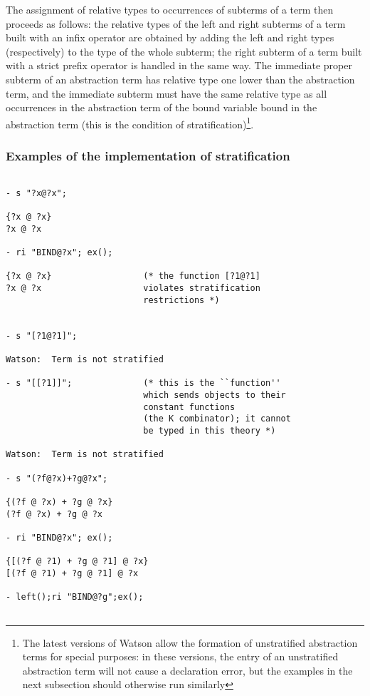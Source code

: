 \documentclass{kluwer}
\begin{document}
\begin{article}
The assignment of relative types to occurrences of subterms of a term
then proceeds as follows: the relative types of the left and right
subterms of a term built with an infix operator are obtained by adding
the left and right types (respectively) to the type of the whole
subterm; the right subterm of a term built with a strict prefix
operator is handled in the same way.  The immediate proper subterm of
an abstraction term has relative type one lower than the abstraction
term, and the immediate subterm must have the same relative type as
all occurrences in the abstraction term of the bound variable bound in
the abstraction term (this is the condition of
stratification)\footnote{The latest versions of Watson allow the
formation of unstratified abstraction terms for special purposes: in these
versions, the entry of an unstratified abstraction term will not cause
a declaration error, but the examples in the next subsection should
otherwise run similarly}.

\subsubsection{Examples of the implementation of stratification}

\begin{verbatim}

- s "?x@?x";

{?x @ ?x}
?x @ ?x

- ri "BIND@?x"; ex();

{?x @ ?x}                  (* the function [?1@?1] 
?x @ ?x                    violates stratification 
                           restrictions *)


- s "[?1@?1]";

Watson:  Term is not stratified

- s "[[?1]]";              (* this is the ``function'' 
                           which sends objects to their
                           constant functions 
                           (the K combinator); it cannot
                           be typed in this theory *)

Watson:  Term is not stratified

- s "(?f@?x)+?g@?x";

{(?f @ ?x) + ?g @ ?x}
(?f @ ?x) + ?g @ ?x

- ri "BIND@?x"; ex();

{[(?f @ ?1) + ?g @ ?1] @ ?x}
[(?f @ ?1) + ?g @ ?1] @ ?x

- left();ri "BIND@?g";ex();


\end{verbatim}
\end{article}
\end{document}
